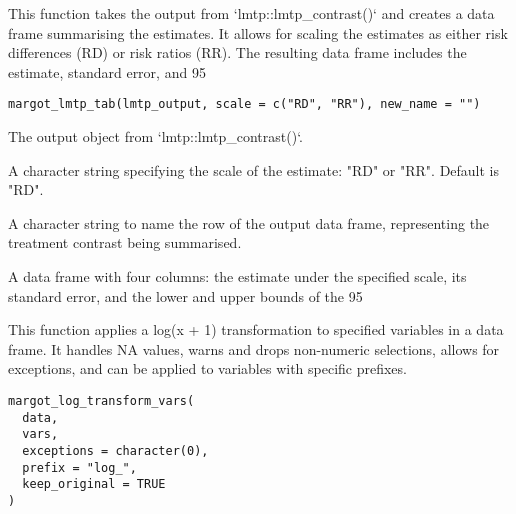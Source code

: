 \documentclass[a4paper]{book}
\begin{document}
%
\begin{Description}
This function takes the output from `lmtp::lmtp\_contrast()` and creates a data frame summarising the
estimates. It allows for scaling the estimates as either risk differences (RD) or risk ratios (RR).
The resulting data frame includes the estimate, standard error, and 95
\end{Description}
%
\begin{Usage}
\begin{verbatim}
margot_lmtp_tab(lmtp_output, scale = c("RD", "RR"), new_name = "")
\end{verbatim}
\end{Usage}
%
\begin{Arguments}
\begin{ldescription}
\item[\code{lmtp\_output}] The output object from `lmtp::lmtp\_contrast()`.

\item[\code{scale}] A character string specifying the scale of the estimate: "RD" or "RR". Default is "RD".

\item[\code{new\_name}] A character string to name the row of the output data frame, representing the treatment
contrast being summarised.
\end{ldescription}
\end{Arguments}
%
\begin{Value}
A data frame with four columns: the estimate under the specified scale, its standard error,
and the lower and upper bounds of the 95
\end{Value}
%
\begin{Description}
This function applies a log(x + 1) transformation to specified variables in a data frame.
It handles NA values, warns and drops non-numeric selections, allows for exceptions,
and can be applied to variables with specific prefixes.
\end{Description}
%
\begin{Usage}
\begin{verbatim}
margot_log_transform_vars(
  data,
  vars,
  exceptions = character(0),
  prefix = "log_",
  keep_original = TRUE
)
\end{verbatim}
\end{Usage}
%
\end{document}

